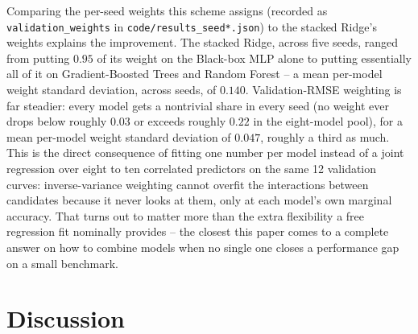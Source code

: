 \documentclass[11pt]{article}
\begin{document}
Comparing the per-seed weights this scheme assigns (recorded as \texttt{validation\_weights} in \texttt{code/results\_seed*.json}) to the stacked Ridge's weights explains the improvement. The stacked Ridge, across five seeds, ranged from putting $0.95$ of its weight on the Black-box MLP alone to putting essentially all of it on Gradient-Boosted Trees and Random Forest -- a mean per-model weight standard deviation, across seeds, of $0.140$. Validation-RMSE weighting is far steadier: every model gets a nontrivial share in every seed (no weight ever drops below roughly $0.03$ or exceeds roughly $0.22$ in the eight-model pool), for a mean per-model weight standard deviation of $0.047$, roughly a third as much. This is the direct consequence of fitting one number per model instead of a joint regression over eight to ten correlated predictors on the same 12 validation curves: inverse-variance weighting cannot overfit the interactions between candidates because it never looks at them, only at each model's own marginal accuracy. That turns out to matter more than the extra flexibility a free regression fit nominally provides -- the closest this paper comes to a complete answer on how to combine models when no single one closes a performance gap on a small benchmark.

\section{Discussion}
\end{document}
